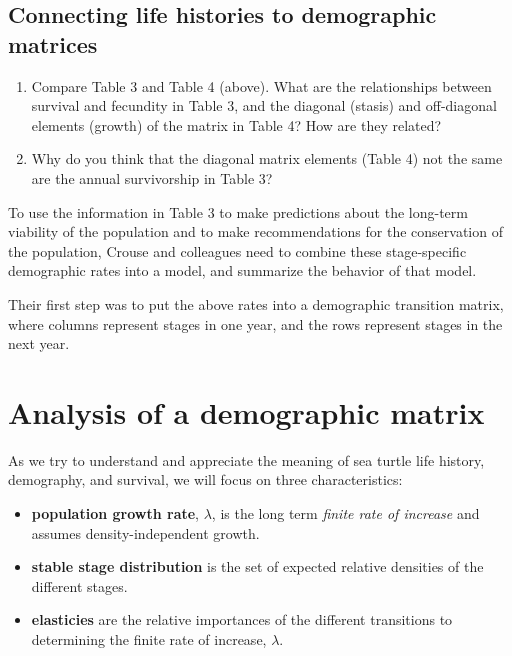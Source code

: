 \documentclass[
  letterpaper,
  DIV=11,
  numbers=noendperiod]{scrreprt}
\providecommand{\tightlist}{%
  \setlength{\itemsep}{0pt}\setlength{\parskip}{0pt}}
\begin{document}
\subsection{Connecting life histories to demographic
matrices}\label{connecting-life-histories-to-demographic-matrices}

\begin{enumerate}
\def\labelenumi{\arabic{enumi}.}
\tightlist
\item
  Compare Table 3 and Table 4 (above). What are the relationships
  between survival and fecundity in Table 3, and the diagonal (stasis)
  and off-diagonal elements (growth) of the matrix in Table 4? How are
  they related?
\item
  Why do you think that the diagonal matrix elements (Table 4) not the
  same are the annual survivorship in Table 3?
\end{enumerate}

To use the information in Table 3 to make predictions about the
long-term viability of the population and to make recommendations for
the conservation of the population, Crouse and colleagues need to
combine these stage-specific demographic rates into a model, and
summarize the behavior of that model.

Their first step was to put the above rates into a demographic
transition matrix, where columns represent stages in one year, and the
rows represent stages in the next year.

\section{Analysis of a demographic
matrix}\label{analysis-of-a-demographic-matrix}

As we try to understand and appreciate the meaning of sea turtle life
history, demography, and survival, we will focus on three
characteristics:

\begin{itemize}
\tightlist
\item
  \textbf{population growth rate}, \(\lambda\), is the long term
  \emph{finite rate of increase} and assumes density-independent growth.
\item
  \textbf{stable stage distribution} is the set of expected relative
  densities of the different stages.
\item
  \textbf{elasticies} are the relative importances of the different
  transitions to determining the finite rate of increase, \(\lambda\).
\end{itemize}
\end{document}
